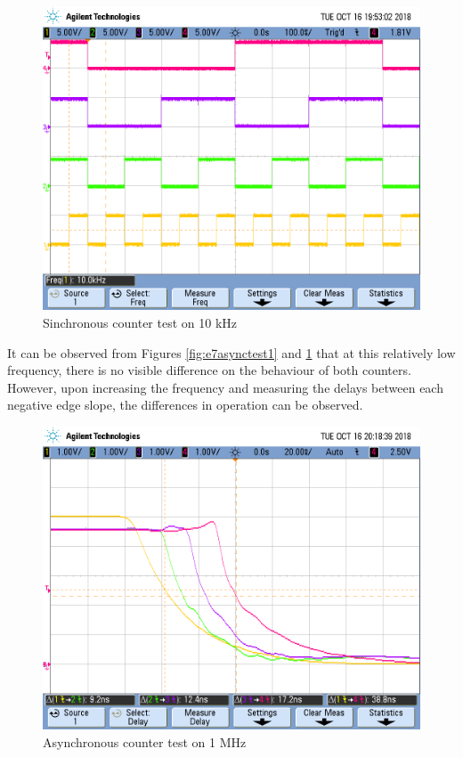 \documentclass[paper=a4]{article}
\begin{document}
    \begin{figure}[ht]
        \begin{center}
            \includegraphics[width=0.6\linewidth]{images/e3_e7_sync4.png}
            \caption{Sinchronous counter test on 10 kHz}
            \label{fig:e7synctest1}
        \end{center}
    \end{figure}

    It can be observed from Figures \ref{fig:e7asynctest1} and \ref{fig:e7synctest1} that at this relatively low frequency, there is no visible difference on
    the behaviour of both counters. However, upon increasing the frequency and measuring the delays
    between each negative edge slope, the differences in operation can be observed.

    \begin{figure}[ht]
        \begin{center}
            \includegraphics[width=0.6\linewidth]{images/e3_e7_async1mhz.png}
            \caption{Asynchronous counter test on 1 MHz}
            \label{fig:e7asynctest2}
        \end{center}
    \end{figure}
\end{document}

